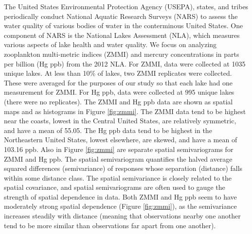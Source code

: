 \documentclass[]{elsarticle} %
\begin{document}
The United States Environmental Protection Agency (USEPA), states, and
tribes periodically conduct National Aquatic Research Surveys (NARS) to
assess the water quality of various bodies of water in the conterminous
United States. One component of NARS is the National Lakes Assessment
(NLA), which measures various aspects of lake health and water quality.
We focus on analyzing zooplankton multi-metric indices (ZMMI) and
mercury concentrations in parts per billion (Hg ppb) from the 2012 NLA.
For ZMMI, data were collected at 1035 unique lakes. At less than 10\% of
lakes, two ZMMI replicates were collected. These were averaged for the
purposes of our study so that each lake had one measurement for ZMMI.
For Hg ppb, data were collected at 995 unique lakes (there were no
replicates). The ZMMI and Hg ppb data are shown as spatial maps and as
histograms in Figure \ref{fig:zmmi}. The ZMMI data tend to be highest
near the coasts, lowest in the Central United States, are relatively
symmetric, and have a mean of 55.05. The Hg ppb data tend to be highest
in the Northeastern United States, lowest elsewhere, are skewed, and
have a mean of 103.16 ppb. Also in Figure \ref{fig:zmmi} are separate
spatial semivariograms for ZMMI and Hg ppb. The spatial semivariogram
quantifies the halved average squared differences (semivariance) of
responses whose separation (distance) falls within some distance class.
The spatial semivariance is closely related to the spatial covariance,
and spatial semivariograms are often used to gauge the strength of
spatial dependence in data. Both ZMMI and Hg ppb seem to have moderately
strong spatial dependence (Figure \ref{fig:zmmi}), as the semivariance
increases steadily with distance (meaning that observations nearby one
another tend to be more similar than observations far apart from one
another).
\end{document}

